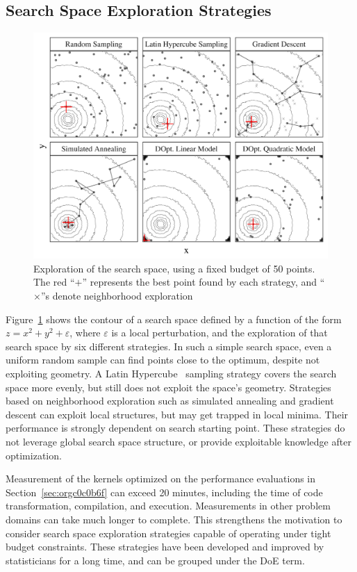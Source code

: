 \documentclass[conference]{IEEEtran}
\begin{document}
\subsection{Search Space Exploration Strategies}
\label{sec:org9d5b325}
\begin{figure}[b]
\centering
\includegraphics[width=.95\columnwidth]{./img/sampling_comparison.pdf}
\caption{\label{fig:org102186b}
Exploration of the search space, using a fixed budget of 50 points. The red ``\(+\)'' represents the best point found by each strategy, and ``\(\times\)''s denote neighborhood exploration}
\end{figure}

Figure~\ref{fig:org102186b} shows the contour of a search space defined
by a function of the form \(z = x^2 + y^2 + \varepsilon\), where \(\varepsilon\) is
a local perturbation, and the exploration of that search space by six different
strategies. In such a simple search space, even a uniform random sample can find
points close to the optimum, despite not exploiting geometry. A Latin
Hypercube~\cite{carnell2018lhs} sampling strategy covers the search space
more evenly, but still does not exploit the space's geometry. Strategies based on
neighborhood exploration such as simulated annealing and gradient descent can
exploit local structures, but may get trapped in local minima. Their
performance is strongly dependent on search starting point. These strategies do
not leverage global search space structure, or provide exploitable knowledge
after optimization.

Measurement of the kernels optimized on the performance evaluations in
Section~\ref{sec:orgc0c0b6f} can exceed 20 minutes, including the time
of code transformation, compilation, and execution. Measurements in other
problem domains can take much longer to complete. This strengthens the
motivation to consider search space exploration strategies capable of operating
under tight budget constraints. These strategies have been developed and
improved by statisticians for a long time, and can be grouped under the DoE
term.
\end{document}
